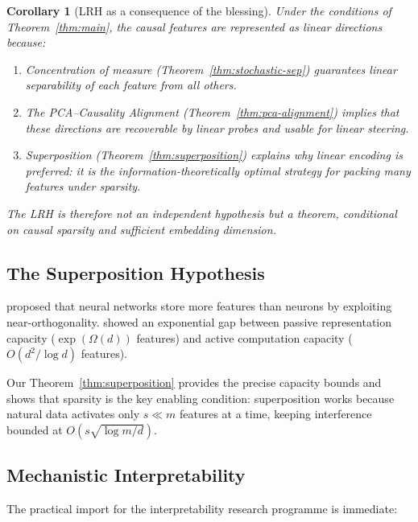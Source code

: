 \documentclass[11pt,a4paper]{article}
\theoremstyle{plain}
\newtheorem{corollary}[theorem]{Corollary}
\theoremstyle{definition}
\theoremstyle{remark}
\begin{document}
\begin{corollary}[LRH as a consequence of the blessing]%
\label{cor:lrh}
Under the conditions of Theorem~\ref{thm:main}, the causal features are
represented as linear directions because:
\begin{enumerate}[label=\textup{(\alph*)}]
  \item Concentration of measure (Theorem~\ref{thm:stochastic-sep}) guarantees
    linear separability of each feature from all others.
  \item The PCA--Causality Alignment (Theorem~\ref{thm:pca-alignment}) implies
    that these directions are recoverable by linear probes and usable for linear
    steering.
  \item Superposition (Theorem~\ref{thm:superposition}) explains \emph{why}
    linear encoding is preferred: it is the information-theoretically optimal
    strategy for packing many features under sparsity.
\end{enumerate}
The LRH is therefore not an independent hypothesis but a \emph{theorem},
conditional on causal sparsity and sufficient embedding dimension.
\end{corollary}

\subsection{The Superposition Hypothesis}\label{sec:superposition-hyp}

\citet{elhage2022superposition} proposed that neural networks store more features
than neurons by exploiting near-orthogonality.
\citet{adler2024complexity} showed an exponential gap between passive
representation capacity ($\exp(\Omega(d))$ features) and active computation
capacity ($O(d^2/\log d)$ features).

Our Theorem~\ref{thm:superposition} provides the precise capacity bounds and
shows that sparsity is the key enabling condition: superposition works because
natural data activates only $s \ll m$ features at a time, keeping interference
bounded at $O(s\sqrt{\log m/d})$.

\subsection{Mechanistic Interpretability}\label{sec:interp}

The practical import for the interpretability research programme is immediate:
\end{document}
